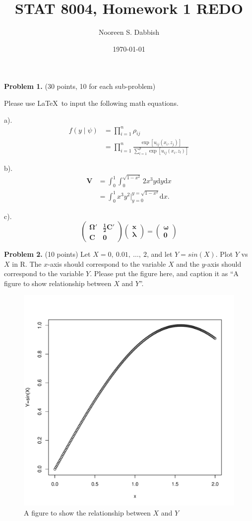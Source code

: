 \documentclass[12pt]{article}
\begin{document}
\title{STAT 8004, Homework 1 REDO}
\author{Nooreen S. Dabbish}
\date{\today}

\maketitle

\textbf{Problem 1.} (30 points, 10 for each sub-problem)

Please use \LaTeX\ to input the following math equations.

a). 
\begin{align*}
f(y\mid\psi) &= \prod_{i=1}^{n} \rho_{ij}\\
             &= \prod_{i=1}^{n} \frac{\exp[u_{ij}(x_{i},z_{j})]}{\sum_{l=1}^{p}\exp[u_{ij}(x_{i},z_{l})]}
\end{align*}
\par b). 
\begin{align*}
\mathbf{V} &= \int_{0}^{1}\int_{0}^{\sqrt{1-x^2}} 2x^3 y \mathrm{d}y\mathrm{d}x\\
           &= \int_{0}^{1} x^3 y^2\bigg|_{y=0}^{y=\sqrt{1-x^2}} \mathrm{d}x.
\end{align*}

c). 
$$\boldsymbol{\begin{pmatrix}
\Omega' &\frac{1}{2}C'\\
C &0 \end{pmatrix}
\begin{pmatrix}
x \\ \lambda
\end{pmatrix}
=
\begin{pmatrix}
\omega \\ 0
\end{pmatrix}}$$

\vspace{3ex}

\textbf{Problem 2.} (10 points) Let $X = 0,\ 0.01,\ \ldots,\ 2$, and let $Y =
sin(X)$. Plot $Y$ vs $X$ in R. The $x$-axis should correspond to
the variable $X$ and the $y$-axis should correspond to the variable
$Y$. Please put the figure here, and caption it as ``A figure to show
relationship between $X$ and $Y$''. 

\begin{figure}
\centering
\includegraphics{hw1fig1redo.pdf}
\caption{A figure to show the relationship between $X$ and $Y$}
\end{figure}
\end{document}
